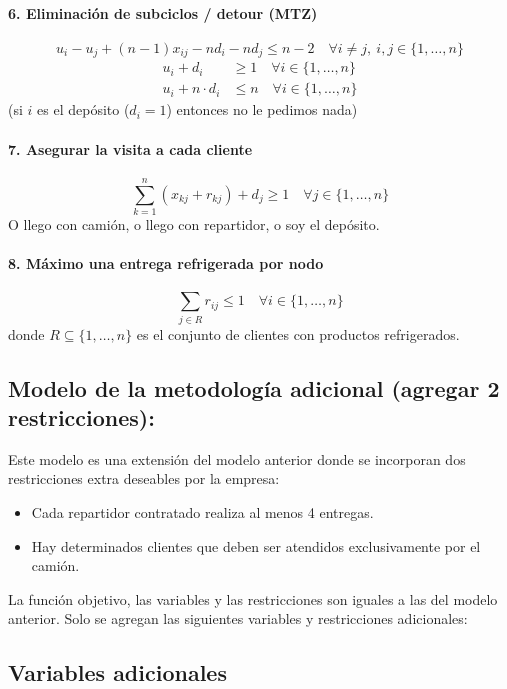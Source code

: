 \documentclass{article}
\begin{document}
\paragraph{6. Eliminación de subciclos / detour (MTZ)} 
\[
u_i - u_j + (n - 1) x_{ij} - n d_i - n d_j \leq n - 2 \quad \forall i \ne j,\ i,j \in \{1, \dots, n\}
\]
\begin{align*}
u_i + d_i &\geq 1 \quad \forall i \in \{1, \dots, n\} \\
u_i + n \cdot d_i &\leq n \quad \forall i \in \{1, \dots, n\}
\end{align*}
(si $i$ es el depósito ($d_i=1$) entonces no le pedimos nada)

\paragraph{7. Asegurar la visita a cada cliente}
\[
\sum_{k=1}^{n} (x_{kj} + r_{kj}) + d_j \geq 1 \quad \forall j \in \{1, \dots, n\}
\]
O llego con camión, o llego con repartidor, o soy el depósito.

\paragraph{8. Máximo una entrega refrigerada por nodo}
\[
\sum_{j \in R} r_{ij} \leq 1 \quad \forall i \in \{1, \dots, n\}
\]
donde \( R \subseteq \{1, \dots, n\} \) es el conjunto de clientes con productos refrigerados.




\subsection{Modelo de la metodología adicional (agregar 2 restricciones):} \label{modelo1}

Este modelo es una extensión del modelo anterior donde se incorporan dos restricciones extra deseables por la empresa: 
\begin{itemize}
    \item Cada repartidor contratado realiza al menos 4 entregas.
    \item Hay determinados clientes que deben ser atendidos exclusivamente por el camión.
\end{itemize}
La función objetivo, las variables y las restricciones son iguales a las del modelo anterior. Solo se agregan las siguientes variables y restricciones adicionales:

\subsection*{Variables adicionales}
\end{document}
